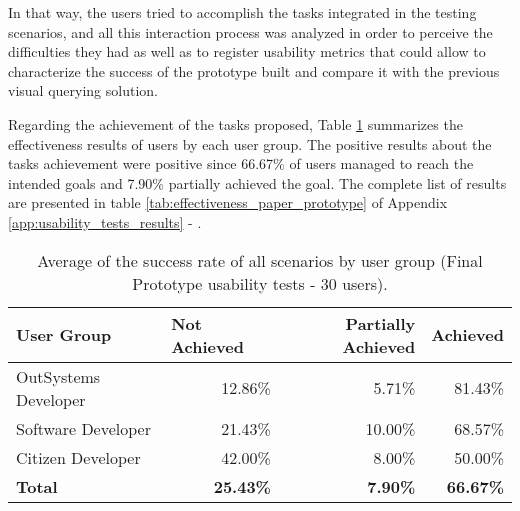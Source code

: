 In that way, the users tried to accomplish the tasks integrated in the testing scenarios, and all this interaction process was analyzed in order to perceive the difficulties they had as well as to register usability metrics that could allow to characterize the success of the prototype built and compare it with the previous visual querying solution.

Regarding the achievement of the tasks proposed, Table \ref{tab:effectiveness_summary_final_prototype} summarizes the effectiveness results of users by each user group. The positive results about the tasks achievement were positive since 66.67\% of users managed to reach the intended goals and 7.90\% partially achieved the goal. The complete list of results are presented in table \ref{tab:effectiveness_paper_prototype} of Appendix \ref{app:usability_tests_results} - .

\begin{table}[tb]
  \caption{Average of the success rate of all scenarios by user group (Final Prototype usability tests - 30 users).}
  \label{tab:effectiveness_summary_final_prototype}
  \begin{tabular}{lrrr}
  \hline
  \rowcolor[HTML]{EFEFEF} 
  \textbf{User Group}  & \multicolumn{1}{l}{\cellcolor[HTML]{EFEFEF}\textbf{Not Achieved}} & \multicolumn{1}{C{2cm}}{\cellcolor[HTML]{EFEFEF}\textbf{Partially Achieved}} & \multicolumn{1}{l}{\cellcolor[HTML]{EFEFEF}\textbf{Achieved}} \\ \hline
  OutSystems Developer & 12.86\%                                                           & 5.71\%                                                                  & 81.43\%                                                       \\
  Software Developer   & 21.43\%                                                           & 10.00\%                                                                  & 68.57\%                                                       \\
  Citizen Developer    & 42.00\%                                                           & 8.00\%                                                                  & 50.00\%                                                       \\
  \textbf{Total}       & \textbf{25.43\%}                                                  & \textbf{7.90\%}                                                         & \textbf{66.67\%}                                              \\ \hline
  \end{tabular}
  \end{table}



